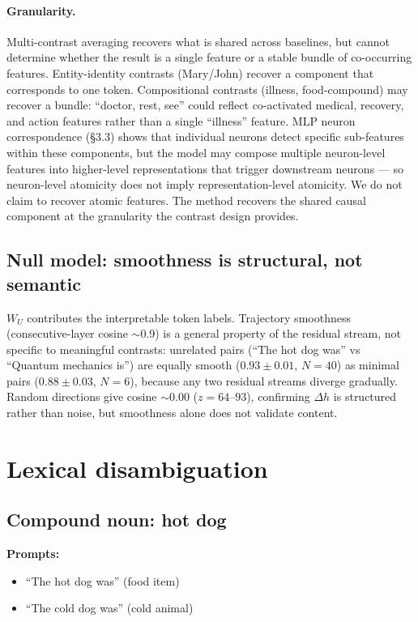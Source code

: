 \documentclass[11pt]{article}
\newcommand{\dhh}{\Delta h}
\newcommand{\WU}{W_U}
\begin{document}
\paragraph{Granularity.} Multi-contrast averaging recovers what is shared across
baselines, but cannot determine whether the result is a single feature or
a stable bundle of co-occurring features. Entity-identity contrasts
(Mary/John) recover a component that corresponds to one token.
Compositional contrasts (illness, food-compound) may recover a bundle:
``doctor, rest, see'' could reflect co-activated medical, recovery, and
action features rather than a single ``illness'' feature. MLP neuron
correspondence (\S3.3) shows that individual neurons detect specific
sub-features within these components, but the model may compose multiple
neuron-level features into higher-level representations that trigger
downstream neurons --- so neuron-level atomicity does not imply
representation-level atomicity. We do not claim to recover atomic
features. The method recovers the shared causal component at the
granularity the contrast design provides.

\subsection{Null model: smoothness is structural, not semantic}

$\WU$ contributes the interpretable token labels. Trajectory smoothness
(consecutive-layer cosine $\sim$0.9) is a general property of the residual stream,
not specific to meaningful contrasts: unrelated pairs (``The hot dog was'' vs
``Quantum mechanics is'') are equally smooth ($0.93 \pm 0.01$, $N=40$) as minimal
pairs ($0.88 \pm 0.03$, $N=6$), because any two residual streams diverge gradually.
Random directions give cosine $\sim$0.00 ($z = 64$--$93$), confirming $\dhh$ is structured
rather than noise, but smoothness alone does not validate content.

\section{Lexical disambiguation}

\subsection{Compound noun: hot dog}

\textbf{Prompts:}
\begin{itemize}[leftmargin=*]
\item ``The hot dog was'' (food item)
\item ``The cold dog was'' (cold animal)
\end{itemize}
\end{document}
